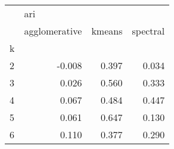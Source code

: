 \begin{tabular}{lrrr}
\toprule
{} & \multicolumn{3}{l}{ari} \\
{} & agglomerative & kmeans & spectral \\
k &               &        &          \\
\midrule
2 &        -0.008 &  0.397 &    0.034 \\
3 &         0.026 &  0.560 &    0.333 \\
4 &         0.067 &  0.484 &    0.447 \\
5 &         0.061 &  0.647 &    0.130 \\
6 &         0.110 &  0.377 &    0.290 \\
\bottomrule
\end{tabular}
